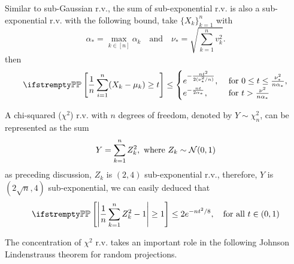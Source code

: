 \documentclass{paper}
\begin{document}
Similar to sub-Gaussian r.v., the sum of sub-exponential r.v. is also a sub-exponential r.v. with the following bound, take $\{X_k\}_{k=1}^n$ with
\[
	\alpha_* =\max_{k\in[n]}\alpha_k\quad \text{and}\quad \nu_* = \sqrt{\sum_{k=1}^{n}v_k^2}.
\]
then
\[
	\PP\left[\frac{1}{n}\sum_{i=1}^{n}(X_k-\mu_k)\geq t\right] \leq \begin{cases}
		e^{-\frac{nt^2}{2(\nu_*^2/n)}}, & \text{ for } 0\leq t\leq \frac{\nu_*^2}{n\alpha_*}, \\
		e^{-\frac{nt}{2\alpha_*}},      & \text{ for } t > \frac{\nu^2}{n\alpha_*}
	\end{cases}
\]
\begin{exmp}
	A chi-squared ($\chi^2$) r.v. with $n$ degrees of freedom, denoted by $Y\sim\chi_n^2$, can be represented as the sum
	\[
		Y = \sum_{k=1}^{n}Z_k^2, \text{ where } Z_k\sim \mathcal{N}(0, 1)
	\]
	as preceding discussion, $Z_k$ is $(2, 4)$ sub-exponential r.v., therefore, $Y$ is $(2\sqrt{n}, 4)$ sub-exponential, we can easily deduced that
	\[
		\PP\left[\left\vert \frac{1}{n}\sum_{k=1}^{n}Z_k^2-1\right\vert\geq 1\right] \leq 2e^{-nt^2/8}, \quad \text{for all } t\in(0, 1)
	\]
\end{exmp}
The concentration of $\chi^2$ r.v. takes an important role in the following Johnson Lindenstrauss theorem for random projections.
\end{document}
